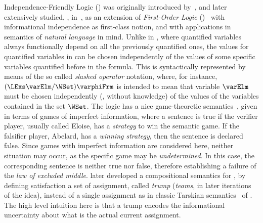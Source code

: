 \documentclass[authoryear]{elsarticle}
\begin{document}
Independence-Friendly Logic (\IF) was originally introduced by~\cite{HS89}, and
later extensively studied, \eg, in~\cite{MSS11}, as an extension of
\emph{First-Order Logic} (\FOL)~\citep{HA28} with informational independence as
first-class notion, and with applications in semantics of \emph{natural
language} in mind.
Unlike in \FOL, where quantified variables always functionally depend on all the
previously quantified ones, the values for quantified variables in \IF can be
chosen independently of the values of some specific variables quantified before
in the formula.
This is syntactically represented by means of the so called \emph{slashed
operator} notation, where, for instance, $(\LExs \varElm/\WSet) \varphiFrm$ is
intended to mean that variable $\varElm$ must be chosen independently (\ie,
without knowledge) of the values of the variables contained in the set $\WSet$.
%
The logic has a nice game-theoretic semantics~\citep{HS97}, given in terms of
games of imperfect information, where a sentence is true if the verifier player,
usually called Eloise, has a \emph{strategy} to win the semantic game.
If the falsifier player, Abelard, has a \emph{winning strategy}, then the
sentence is declared false.
Since games with imperfect information are considered here, neither situation
may occur, as the specific game may be \emph{undetermined}.
In this case, the corresponding sentence is neither true nor false, therefore
establishing a failure of the \emph{law of excluded middle}.
\cite{Hod97a} later developed a compositional semantics for \IF, by defining
satisfaction \wrt a set of assignment, called \emph{trump} (\aka \emph{teams},
in later iterations of the idea), instead of a single assignment as in classic
Tarskian semantics~\citep{Tar36,Tar44} of \FOL.
The high level intuition here is that a trump encodes the informational
uncertainty about what is the actual current assignment.
\end{document}

